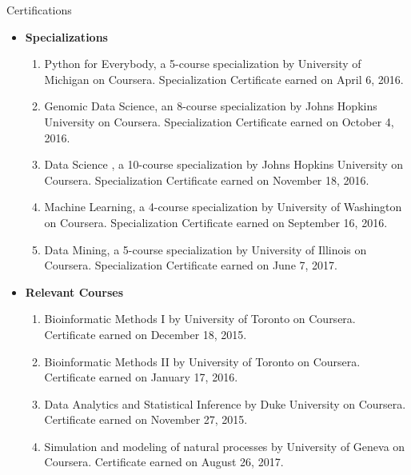\documentclass{resume} %
\begin{document}
\begin{rSection}{Certifications}
\begin{itemize}
\item \noindent \textbf{Specializations}
\begin{enumerate}
\item \noindent Python for Everybody, a 5-course specialization by University of Michigan on Coursera. Specialization Certificate earned on April 6, 2016.
\item \noindent Genomic Data Science, an 8-course specialization by Johns Hopkins University on Coursera. Specialization Certificate earned on October 4, 2016.
\item \noindent Data Science , a 10-course specialization by Johns Hopkins University on Coursera. Specialization Certificate earned on November 18, 2016.
\item \noindent Machine Learning, a 4-course specialization by University of Washington on Coursera. Specialization Certificate earned on September 16, 2016.
\item \noindent Data Mining, a 5-course specialization by University of Illinois on Coursera. Specialization Certificate earned on June 7, 2017.
\end{enumerate}
\item \noindent \textbf{Relevant Courses}
\begin{enumerate}
\item  Bioinformatic Methods I by University of Toronto on Coursera. Certificate earned on December 18, 2015.
\item  Bioinformatic Methods II by University of Toronto on Coursera. Certificate earned on January 17, 2016.
\item Data Analytics and Statistical Inference by Duke University on Coursera. Certificate earned on November 27, 2015.
\item Simulation and modeling of natural processes by University of Geneva on Coursera. Certificate earned on August 26, 2017.

\end{enumerate}
\end{itemize}
\end{rSection}
\end{document}
